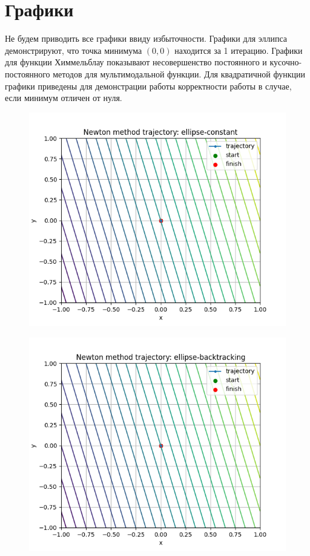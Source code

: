 \documentclass{article}
\begin{document}
\section{Графики}
Не будем приводить все графики ввиду избыточности. Графики для эллипса демонстрируют, что точка минимума $(0, 0)$ находится за 1 итерацию. Графики для функции Химмельблау показывают несовершенство постоянного и кусочно-постоянного методов для мультимодальной функции. Для квадратичной функции графики приведены для демонстрации работы корректности работы в случае, если минимум отличен от нуля.
\begin{figure}[H]
    \centering
    \includegraphics[width=1\linewidth]{ellipse-constant.png}
    \label{fig:enter-label}
\end{figure}
\begin{figure}[H]
    \centering
    \includegraphics[width=1\linewidth]{ellipse-backtracking.png}
    \label{fig:enter-label}
\end{figure}
\end{document}
